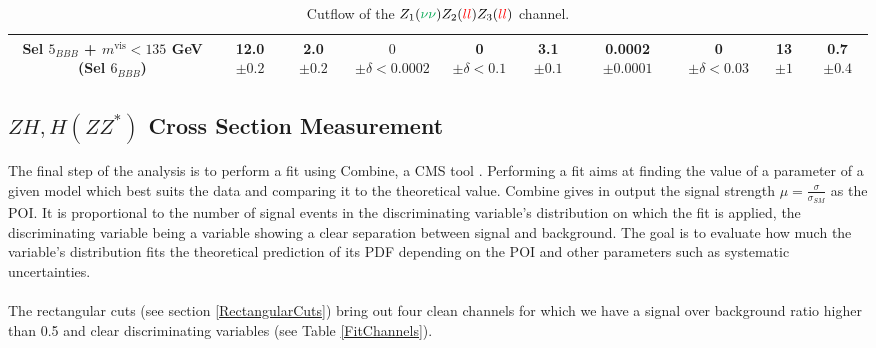 \documentclass[a4paper,11pt]{article}
\begin{document}
\begin{table}[h!]
\begin{adjustbox}{width=1\textwidth}
\begin{tabular}{|c|c|c|c|c|c|c|c|c|c|}
            \thead{Sel $5_{BBB}$ + $m^{\mbox{vis}}<135$ GeV \\ (Sel $6_{BBB}$)} & \thead{12.0\\$\pm0.2$} & \thead{2.0\\$\pm0.2$} & \thead{$0$\\$\pm\delta<0.0002$} & \thead{0\\$\pm\delta<0.1$} & \thead{3.1\\$\pm0.1$} & \thead{0.0002\\$\pm0.0001$} & \thead{0\\$\pm\delta<0.03$} & \thead{13\\$\pm1$} & \thead{0.7\\$\pm0.4$} \\
            \hline
        \end{tabular}
        \end{adjustbox}
        \caption{Cutflow of the $Z_1(\textcolor{Green}{\nu\nu})Z_2(\textcolor{red}{ll})Z_3(\textcolor{red}{ll})$ channel.}
        \label{Cutflowvvllll}
    \end{table}
    
	\subsection[$ZH,H(ZZ^*)$ Cross Section Measurement]{\boldmath$ZH,H(ZZ^*)$ Cross Section Measurement}
    The final step of the analysis is to perform a fit using Combine, a CMS tool \cite{cms2024combine}. Performing a fit aims at finding the value of a parameter of a given model which best suits the data and comparing it to the theoretical value. Combine gives in output the signal strength $\mu=\frac{\sigma}{\sigma_{SM}}$ as the \acrshort{POI}. It is proportional to the number of signal events in the discriminating variable's distribution on which the fit is applied, the discriminating variable being a variable showing a clear separation between signal and background. The goal is to evaluate how much the variable's distribution fits the theoretical prediction of its \acrshort{PDF} depending on the POI and other parameters such as systematic uncertainties.\\\\
    \noindent
    The rectangular cuts (see section \ref{RectangularCuts}) bring out four clean channels for which we have a signal over background ratio higher than 0.5 and clear discriminating variables (see Table \ref{FitChannels}).
\end{document}
